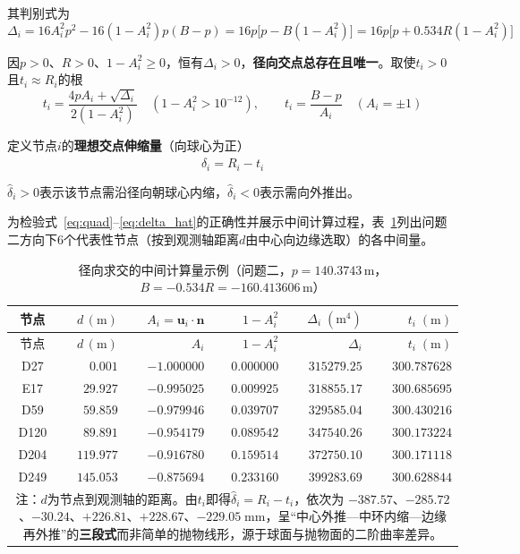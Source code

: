 \documentclass[withoutpreface]{cumcmthesis}
\begin{document}
其判别式为
\begin{equation}\label{eq:disc}
\Delta_i=16A_i^{2}p^{2}-16(1-A_i^{2})p(B-p)=16p\bigl[p-B(1-A_i^{2})\bigr]=16p\bigl[p+0.534R(1-A_i^{2})\bigr]
\end{equation}

因$p>0$、$R>0$、$1-A_i^{2}\ge0$，恒有$\Delta_i>0$，\textbf{径向交点总存在且唯一}。取使$t_i>0$且$t_i\approx R_i$的根
\begin{equation}\label{eq:root}
t_i=\frac{4pA_i+\sqrt{\Delta_i}}{2(1-A_i^{2})}\quad(1-A_i^{2}>10^{-12}),\qquad t_i=\frac{B-p}{A_i}\quad(A_i=\pm1)
\end{equation}

定义节点$i$的\textbf{理想交点伸缩量}（向球心为正）
\begin{equation}\label{eq:delta_hat}
\hat{\delta}_i=R_i-t_i
\end{equation}

$\hat{\delta}_i>0$表示该节点需沿径向朝球心内缩，$\hat{\delta}_i<0$表示需向外推出。

为检验式~\eqref{eq:quad}--\eqref{eq:delta_hat}的正确性并展示中间计算过程，表~\ref{tab:radial_demo}列出问题二方向下$6$个代表性节点（按到观测轴距离$d$由中心向边缘选取）的各中间量。

\begin{longtable}{c r r r r r}
\caption{径向求交的中间计算量示例（问题二，$p=140.3743\,\mathrm{m}$，$B=-0.534R=-160.413606\,\mathrm{m}$）} \label{tab:radial_demo} \\
\toprule
节点 & $d\,(\mathrm{m})$ & $A_i=\mathbf{u}_i\cdot\mathbf{n}$ & $1-A_i^{2}$ & $\Delta_i\;(\mathrm{m}^4)$ & $t_i\;(\mathrm{m})$ \\
\midrule
\endfirsthead
\toprule
节点 & $d\,(\mathrm{m})$ & $A_i$ & $1-A_i^{2}$ & $\Delta_i$ & $t_i\;(\mathrm{m})$ \\
\midrule
\endhead
\bottomrule
\endfoot
\bottomrule
\endlastfoot
D27 & $0.001$ & $-1.000000$ & $0.000000$ & $315279.25$ & $300.787628$ \\
E17 & $29.927$ & $-0.995025$ & $0.009925$ & $318855.17$ & $300.685695$ \\
D59 & $59.859$ & $-0.979946$ & $0.039707$ & $329585.04$ & $300.430216$ \\
D120 & $89.891$ & $-0.954179$ & $0.089542$ & $347540.26$ & $300.173224$ \\
D204 & $119.977$ & $-0.916780$ & $0.159514$ & $372750.10$ & $300.171118$ \\
D249 & $145.053$ & $-0.875694$ & $0.233160$ & $399283.69$ & $300.628844$ \\
\midrule
\multicolumn{6}{p{13.2cm}}{\small 注：$d$为节点到观测轴的距离。由$t_i$即得$\hat{\delta}_i=R_i-t_i$，依次为 $-387.57$、$-285.72$、$-30.24$、$+226.81$、$+228.67$、$-229.05\;\mathrm{mm}$，呈``中心外推—中环内缩—边缘再外推''的\textbf{三段式}而非简单的抛物线形，源于球面与抛物面的二阶曲率差异。}\\
\bottomrule
\end{longtable}
\end{document}
